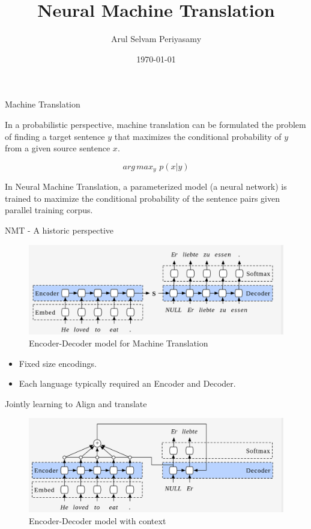 ﻿\documentclass[aspectratio=43,mathserif,xcolor={usenames,dvipsnames,svgnames,table},10pt]{beamer}
\title[NMT]{Neural Machine Translation}
\author[Arul Selvam Periyasamy]{Arul Selvam Periyasamy}
\institute[University of Bonn]{Rheinische Friedrich-Wilhelms-Universit\"at Bonn\\
Seminar: Natural Language Processing}
\date{\today}
\begin{document}
\maketitle


\begin{frame}{Machine Translation}

In a probabilistic perspective, machine translation can be formulated the problem of finding a target sentence $y$ that maximizes the conditional probability of $y$ from a given source sentence $x$.

$$ arg\,max _{y}  \,\, p(x|y)$$
 
 
In Neural Machine Translation, a parameterized model (a neural network) is trained to maximize the conditional probability of the sentence pairs given parallel training corpus.
\end{frame}

\begin{frame}{NMT - A historic perspective}
  \begin{figure}[h]
    \includegraphics[width=0.9\linewidth]{images/enc_dec.png}  
    \caption{Encoder-Decoder model for Machine Translation}
  \end{figure}
\begin{itemize}
 \item Fixed size encodings.
 \item Each language typically required an Encoder and Decoder.
\end{itemize}
\end{frame}

\begin{frame}{Jointly learning to Align and translate}
\begin{figure}[h]
    \includegraphics[width=0.9\linewidth]{images/context.png}  
    \caption{Encoder-Decoder model with context}
  \end{figure}
\end{frame}
\end{document}
